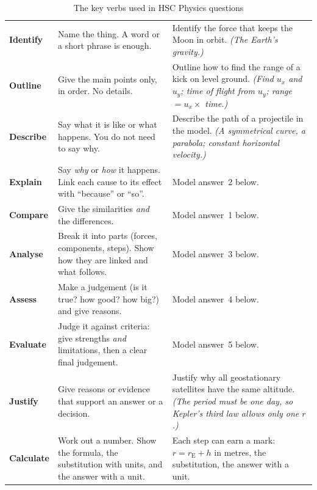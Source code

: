 \begin{table}
  \caption*{The key verbs used in HSC Physics questions}
  \centering
  \small
  \begin{tabular}{@{}L{19mm}L{60mm}L{62mm}@{}}
    \toprule
     &  & \\
    \midrule
    \textbf{Identify} & Name the thing. A word or a short phrase is enough.
      & Identify the force that keeps the Moon in orbit. \emph{(The Earth's gravity.)}\\
    \textbf{Outline} & Give the main points only, in order. No details.
      & Outline how to find the range of a kick on level ground. \emph{(Find $u_x$ and
        $u_y$; time of flight from $u_y$; range $= u_x \times$ time.)}\\
    \textbf{Describe} & Say what it is like or what happens. You do not need to say why.
      & Describe the path of a projectile in the model. \emph{(A symmetrical curve, a
        parabola; constant horizontal velocity.)}\\
    \textbf{Explain} & Say \emph{why} or \emph{how} it happens. Link each cause to its
      effect with ``because'' or ``so''.
      & Model answer~2 below.\\
    \textbf{Compare} & Give the similarities \emph{and} the differences.
      & Model answer~1 below.\\
    \textbf{Analyse} & Break it into parts (forces, components, steps). Show how they are
      linked and what follows.
      & Model answer~3 below.\\
    \textbf{Assess} & Make a judgement (is it true? how good? how big?) and give reasons.
      & Model answer~4 below.\\
    \textbf{Evaluate} & Judge it against criteria: give strengths \emph{and} limitations,
      then a clear final judgement.
      & Model answer~5 below.\\
    \textbf{Justify} & Give reasons or evidence that support an answer or a decision.
      & Justify why all geostationary satellites have the same altitude. \emph{(The period
        must be one day, so Kepler's third law allows only one $r$.)}\\
    \textbf{Calculate} & Work out a number. Show the formula, the substitution with units,
      and the answer with a unit.
      & Each step can earn a mark: $r = r_\mathrm{E} + h$ in metres, the substitution, the
        answer with a unit.\\
    \bottomrule
  \end{tabular}
\end{table}

